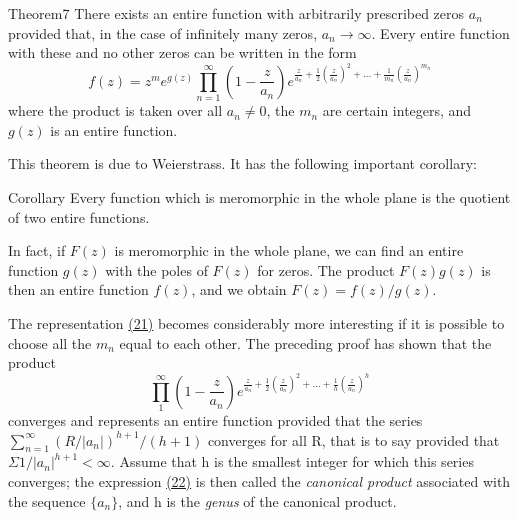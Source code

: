 \begin{originalstatement}{Theorem}{7}\label{thm:5.7}
There exists an entire function with arbitrarily prescribed zeros $a_{n}$ provided that, in the case of infinitely many zeros, $a_{n} \to \infty$. Every entire function with these and no other zeros can be written in the form
\begin{equation*}
f (z) = z ^ {m} e ^ {g (z)} \prod_ {n = 1} ^ {\infty} \left(1 - \frac {z}{a _ {n}}\right) e ^ {\frac {z}{a _ {n}} + \frac {1}{2} \left(\frac {z}{a _ {n}}\right) ^ {2} + \dots + \frac {1}{m _ {n}} \left(\frac {z}{a _ {n}}\right) ^ {m _ {n}}}\tag{21}\label{eq:5.21}
\end{equation*}
where the product is taken over all $a_{n} \neq 0$, the $m_{n}$ are certain integers, and $g(z)$ is an entire function.

\end{originalstatement}

This theorem is due to Weierstrass. It has the following important corollary:

\begin{originalstatement}{Corollary}{}\label{cor:5.unnumbered-p212-b1}
Every function which is meromorphic in the whole plane is the quotient of two entire functions.
\end{originalstatement}
In fact, if $F(z)$ is meromorphic in the whole plane, we can find an entire function $g(z)$ with the poles of $F(z)$ for zeros. The product $F(z)g(z)$ is then an entire function $f(z)$, and we obtain $F(z) = f(z)/g(z)$.

The representation \hyperref[eq:5.21]{(21)} becomes considerably more interesting if it is possible to choose all the $m_{n}$ equal to each other. The preceding proof has shown that the product
\begin{equation*}
\prod_ {1} ^ {\infty} \left(1 - \frac {z}{a _ {n}}\right) e ^ {\frac {z}{a _ {n}} + \frac {1}{2} \left(\frac {z}{a _ {n}}\right) ^ {2} + \dots + \frac {1}{h} \left(\frac {z}{a _ {n}}\right) ^ {h}}\tag{22}\label{eq:5.22}
\end{equation*}
converges and represents an entire function provided that the series $\sum_{n=1}^{\infty}(R/|a_{n}|)^{h+1}/(h+1)$ converges for all R, that is to say provided that $\Sigma1/|a_{n}|^{h+1}<\infty$. Assume that h is the smallest integer for which this series converges; the expression \hyperref[eq:5.22]{(22)} is then called the \emph{canonical product} associated with the sequence $\{a_{n}\}$, and h is the \emph{genus} of the canonical product.

